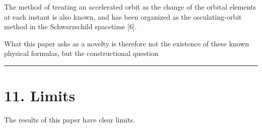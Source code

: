 \documentclass[
  a4paper,
]{article}
\begin{document}
The method of treating an accelerated orbit as the change of the orbital
elements at each instant is also known, and has been organized as the
osculating-orbit method in the Schwarzschild spacetime {[}6{]}.

What this paper asks as a novelty is therefore not the existence of
these known physical formulas, but the constructional question

\begin{center}
\end{center}

\begin{center}\rule{0.5\linewidth}{0.5pt}\end{center}

\section{11. Limits}\label{limits}

The results of this paper have clear limits.
\end{document}
